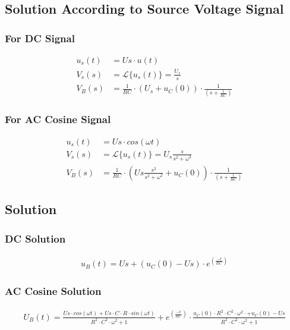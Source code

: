 \documentclass{article}
\begin{document}
\subsection{Solution According to Source Voltage Signal}
\subsubsection{For DC Signal}
\begin{align*}
    u_s(t) &= Us \cdot u(t)\\
    V_s(s) &= \mathcal{L} \big\{u_s(t)\big\} = \frac{U_s}{s}\\
    V_B(s) &= \frac{1}{RC}\cdot (U_s + u_C(0))\cdot \frac{1}{(s+\frac{1}{RC})}
\end{align*}
\subsubsection{For AC Cosine Signal}
\begin{align*}
    u_s(t) &= Us \cdot cos(\omega t)\\
    V_s(s) &= \mathcal{L} \big\{u_s(t)\big\} =U_s \frac{s}{s^2+\omega^2}\\
    V_B(s) &= \frac{1}{RC}\cdot (Us\frac{ s^2}{s^2+\omega^2} + u_C(0))\cdot \frac{1}{(s+\frac{1}{RC})}
\end{align*}
\subsection{Solution}
\subsubsection{DC Solution}
\begin{align*}
   u_B(t) = Us + ( u_C(0)-Us)\cdot  e^(\frac{-t}{RC})
\end{align*}
\subsubsection{AC Cosine Solution}
\begin{align*}
   U_B(t) =  \frac{Us \cdot cos(\omega t) + Us\cdot C\cdot R \cdot sin(\omega t)}{R^2\cdot C^2 \cdot \omega ^2 +1}+e^(\frac{-t}{RC})\cdot \frac{u_C(0)\cdot R^2\cdot C^2\cdot \omega^2\cdot + u_C(0)-Us}{R^2\cdot C^2 \cdot \omega ^2 +1}
\end{align*}
\end{document}
